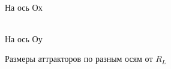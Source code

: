 \documentclass[12pt]{article}
\begin{document}
\begin{figure}[H]
	\begin{minipage}[h]{0.47\linewidth}
	  \\ На ось Ох
	\end{minipage}
	\hfill
	\begin{minipage}[h]{0.47\linewidth}
	 \\ На ось Оу
	\end{minipage}
	\caption{Размеры аттракторов по разным осям от $R_L$}
	\label{fig:projections_xy_rl}
\end{figure}
\end{document}
